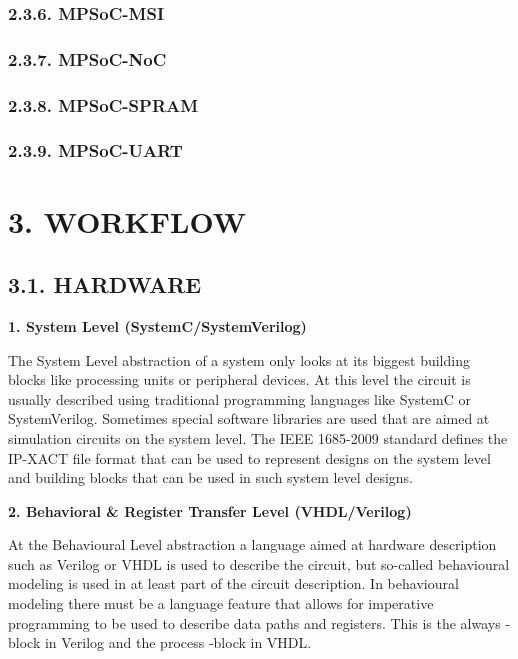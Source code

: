 \documentclass[]{article}
\begin{document}
\subsubsection{2.3.6. MPSoC-MSI}\label{mpsoc-msi}

\subsubsection{2.3.7. MPSoC-NoC}\label{mpsoc-noc}

\subsubsection{2.3.8. MPSoC-SPRAM}\label{mpsoc-spram}

\subsubsection{2.3.9. MPSoC-UART}\label{mpsoc-uart}

\section{3. WORKFLOW}\label{workflow}

\subsection{3.1. HARDWARE}\label{hardware}

\textbf{1. System Level (SystemC/SystemVerilog)}

The System Level abstraction of a system only looks at its biggest
building blocks like processing units or peripheral devices. At this
level the circuit is usually described using traditional programming
languages like SystemC or SystemVerilog. Sometimes special software
libraries are used that are aimed at simulation circuits on the system
level. The IEEE 1685-2009 standard defines the IP-XACT file format that
can be used to represent designs on the system level and building blocks
that can be used in such system level designs.

\textbf{2. Behavioral \& Register Transfer Level (VHDL/Verilog)}

At the Behavioural Level abstraction a language aimed at hardware
description such as Verilog or VHDL is used to describe the circuit, but
so-called behavioural modeling is used in at least part of the circuit
description. In behavioural modeling there must be a language feature
that allows for imperative programming to be used to describe data paths
and registers. This is the always -block in Verilog and the process
-block in VHDL.
\end{document}
